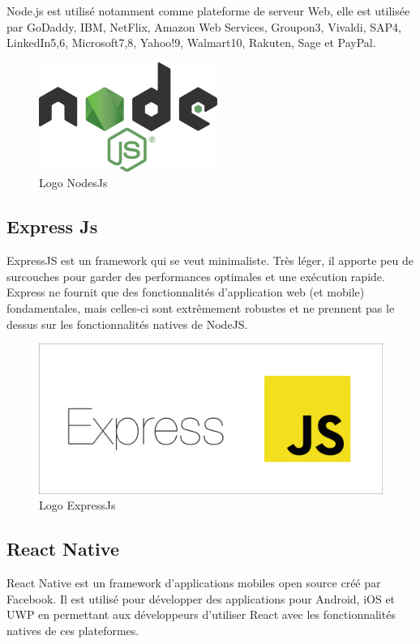 Node.js est utilisé notamment comme plateforme de serveur Web, elle est utilisée par GoDaddy, IBM, NetFlix, Amazon Web Services, Groupon3, Vivaldi, SAP4, LinkedIn5,6, Microsoft7,8, Yahoo!9, Walmart10, Rakuten, Sage et PayPal.
\begin{figure}[h]
	\centering
    \includegraphics[scale=0.4]{img/part3/4.3}
    \caption{Logo NodesJs}
\end{figure}

\subsection{Express Js}
ExpressJS est un framework qui se veut minimaliste. Très léger, il apporte peu de surcouches pour garder des performances optimales et une exécution rapide. Express ne fournit que des fonctionnalités d’application web (et mobile) fondamentales, mais celles-ci sont extrêmement robustes et ne prennent pas le dessus sur les fonctionnalités natives de NodeJS.
\begin{figure}[h]
	\centering
    \includegraphics[scale=0.1]{img/part3/4.4}
    \caption{Logo ExpressJs}
\end{figure} 

\newpage
\subsection{React Native}
React Native est un framework d'applications mobiles open source créé par Facebook. Il est utilisé pour développer des applications pour Android, iOS et UWP en permettant aux développeurs d’utiliser React avec les fonctionnalités natives de ces plateformes.

